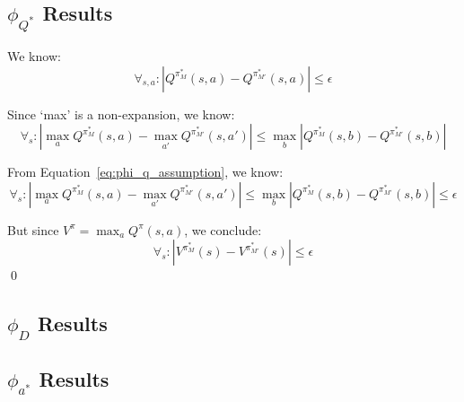 \documentclass[11pt]{amsart}
\begin{document}
\subsection{$\phi_{Q^*}$ Results}

We know:
\begin{equation}
\forall_{s,a} : | Q^{\pi^*_M}(s,a) - Q^{\pi^*_{M'}}(s,a)| \leq \epsilon
\label{eq:phi_q_assumption}
\end{equation}

Since `max' is a non-expansion, we know:
\begin{equation}
\forall_s : |\max_a Q^{\pi^*_M}(s,a) - \max_{a'} Q^{\pi^*_{M'}}(s,a')| \leq \max_b | Q^{\pi^*_M}(s,b) - Q^{\pi^*_{M'}}(s,b)|
\end{equation}

From Equation~\ref{eq:phi_q_assumption}, we know:
\begin{equation}
\forall_s : |\max_a Q^{\pi^*_M}(s,a) - \max_{a'} Q^{\pi^*_{M'}}(s,a')| \leq \max_b | Q^{\pi^*_M}(s,b) - Q^{\pi^*_{M'}}(s,b)| \leq \epsilon
\end{equation}

But since $V^{\pi} = \max_a Q^\pi(s,a)$, we conclude:
\begin{equation}
\forall_s : |V^{\pi^*_M}(s) - V^{\pi^*_{M'}}(s)| \leq \epsilon
\end{equation}
\qed

\subsection{$\phi_{D}$ Results}

\subsection{$\phi_{a^*}$ Results}



\newpage

\end{document}
